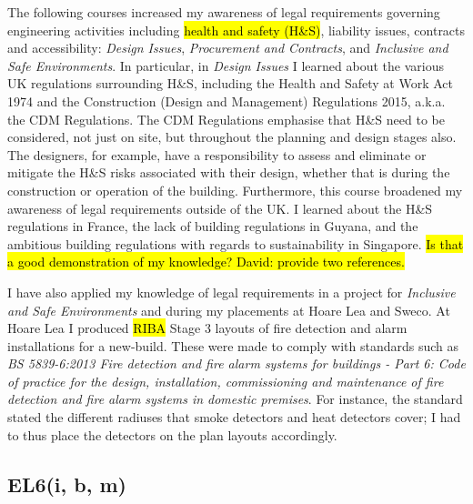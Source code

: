 The following courses increased my awareness of legal requirements governing engineering activities including \hl{health and safety (H\&S)}, liability issues, contracts and accessibility:
\textit{Design Issues},
\textit{Procurement and Contracts},
and \textit{Inclusive and Safe Environments}.
In particular, in \textit{Design Issues} I learned about the various UK regulations surrounding H\&S, including the Health and Safety at Work Act 1974 and the Construction (Design and Management) Regulations 2015, a.k.a. the CDM Regulations.
The CDM Regulations emphasise that H\&S need to be considered, not just on site, but throughout the planning and design stages also.
The designers, for example, have a responsibility to assess and eliminate or mitigate the H\&S risks associated with their design, whether that is during the construction or operation of the building.
Furthermore, this course broadened my awareness of legal requirements outside of the UK.
I learned about the H\&S regulations in France, the lack of building regulations in Guyana, and the ambitious building regulations with regards to sustainability in Singapore.
\hl{Is that a good demonstration of my knowledge? David: provide two references.}

I have also applied my knowledge of legal requirements in a project for \textit{Inclusive and Safe Environments} and during my placements at Hoare Lea and Sweco.
At Hoare Lea I produced \hl{RIBA} Stage 3 layouts of fire detection and alarm installations for a new-build.
These were made to comply with standards such as \textit{BS 5839-6:2013 Fire detection and fire alarm systems for buildings - Part 6: Code of practice for the design, installation, commissioning and maintenance of fire detection and fire alarm systems in domestic premises}.
For instance, the standard stated the different radiuses that smoke detectors and heat detectors cover; I had to thus place the detectors on the plan layouts accordingly.


\subsection*{EL6(i, b, m)}

